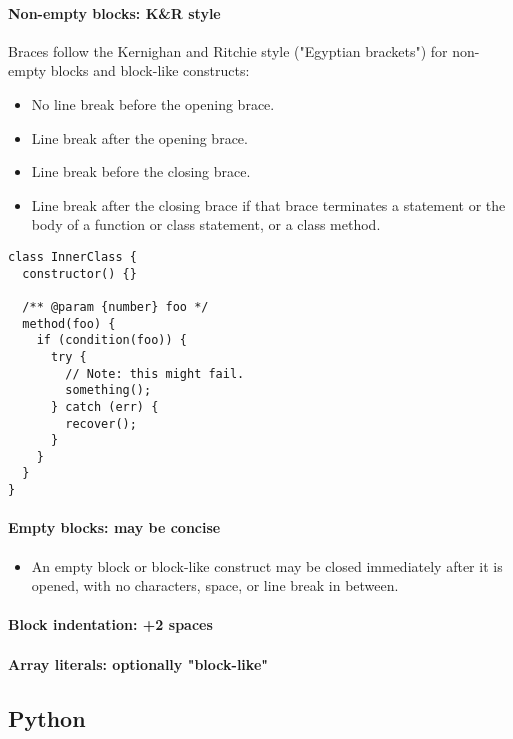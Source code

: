 \documentclass[a4paper, 11pt]{article}
\begin{document}
\paragraph{Non-empty blocks: K\&R style\\}
Braces follow the Kernighan and Ritchie style ("Egyptian brackets") for non-empty blocks and block-like constructs:
\begin{itemize}
\item No line break before the opening brace.
\item Line break after the opening brace.
\item Line break before the closing brace.
\item Line break after the closing brace if that brace terminates a statement or the body of a function or class statement, or a class method. 
\end{itemize}
\begin{verbatim}
class InnerClass {
  constructor() {}

  /** @param {number} foo */
  method(foo) {
    if (condition(foo)) {
      try {
        // Note: this might fail.
        something();
      } catch (err) {
        recover();
      }
    }
  }
}
\end{verbatim}

\paragraph{Empty blocks: may be concise}
\begin{itemize}
\item An empty block or block-like construct may be closed immediately after it is opened, with no characters, space, or line break in between.
\end{itemize}

\paragraph{Block indentation: +2 spaces}

\paragraph{Array literals: optionally "block-like"}

\newpage
\subsection{Python}
\end{document}
